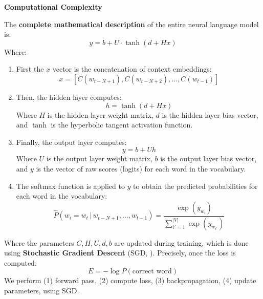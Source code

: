 \highspace
\begin{flushleft}
    \textcolor{Red2}{ \textbf{Computational Complexity}}
\end{flushleft}
The \textbf{complete mathematical description} of the entire neural language model is:
\begin{equation}
    y = b + U \cdot \tanh\left(d + Hx\right)
\end{equation}
Where:
\begin{enumerate}
    \item First the $x$ vector is the concatenation of context embeddings:
    \begin{equation*}
        x = \left[C\left(w_{t-N+1}\right), C\left(w_{t-N+2}\right), \dots, C\left(w_{t-1}\right)\right]
    \end{equation*}
    \item Then, the hidden layer computes:
    \begin{equation*}
        h = \tanh\left(d + Hx\right)
    \end{equation*}
    Where $H$ is the hidden layer weight matrix, $d$ is the hidden layer bias vector, and $\tanh$ is the hyperbolic tangent activation function.
    \item Finally, the output layer computes:
    \begin{equation*}
        y = b + U h
    \end{equation*}
    Where $U$ is the output layer weight matrix, $b$ is the output layer bias vector, and $y$ is the vector of raw scores (logits) for each word in the vocabulary.
    \item The softmax function is applied to $y$ to obtain the predicted probabilities for each word in the vocabulary:
    \begin{equation*}
        \hat{P}\left(w_i = w_t \, | \, w_{t-N+1}, \dots, w_{t-1}\right) = \frac{\exp\left(y_{w_i}\right)}{\displaystyle\sum_{i'=1}^{\left|V\right|} \exp\left(y_{w_{i'}}\right)}
    \end{equation*}
\end{enumerate}
Where the parameters $C, H, U, d, b$ are updated during training, which is done using \textbf{Stochastic Gradient Descent} (SGD, ). Precisely, once the loss is computed:
\begin{equation*}
    E = -\log P\left(\text{correct word}\right)
\end{equation*}
We perform (1) forward pass, (2) compute loss, (3) backpropagation, (4) update parameters, using SGD.

